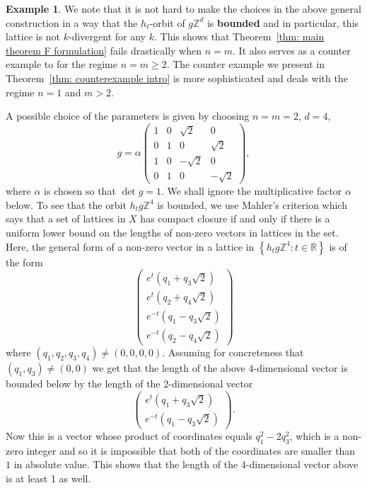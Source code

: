 \documentclass[reqno,11pt, twoside]{amsart}
\theoremstyle{plain}
\theoremstyle{definition}
\newtheorem{exmp}[thm]{Example}
\theoremstyle{definition}
\theoremstyle{remark}
\numberwithin{equation}{section}
\newcommand{\al}{\alpha}
\newcommand{\bR}{\mathbb{R}}
\newcommand{\bZ}{\mathbb{Z}}
\newcommand\seta[1]{\left\{#1\right\}}
\newcommand\pa[1]{\left(#1\right)}
\newcommand\mat[1]{\pa{\begin{matrix}#1\end{matrix}}}
\begin{document}
\begin{exmp}
    We note that it is not hard to make the choices in the above general construction in a way that the $h_t$-orbit of $g\bZ^d$ is \textbf{bounded} and in particular, this lattice is not $k$-divergent for any $k$. This shows that Theorem~\ref{thm: main theorem F formulation} fails drastically when $n=m$. It also serves as a counter example to 
    \cite[Theorem 2.3]{GDV} for the regime $n=m\ge 2$. 
    The counter example we present in Theorem~\ref{thm: counterexample intro} is more sophisticated and deals with the regime $n=1$ and $m>2$. 

    A possible choice of the parameters is given by choosing $n=m=2$, $d=4$,
    $$g = \al \mat{1&0&\sqrt{2}&0\\ 0&1&0&\sqrt{2}\\
    1&0&-\sqrt{2}&0\\ 0&1&0&-\sqrt{2}},$$
    where $\al$ is chosen so that $\det g =1$. We shall ignore the multiplicative factor $\al$ below.  
    To see that the orbit $h_t g\bZ^4$ is bounded, we use Mahler's criterion which says that a set of lattices in $X$ has compact closure if and only if there is a uniform lower bound on the lengths of non-zero vectors in lattices in the set. Here, the general form of a non-zero vector in a lattice in $\seta{h_t g\bZ^4:t\in \bR}$ is of the form 
    $$\mat{ 
    e^t (q_1 + q_3\sqrt{2})\\
    e^t (q_2 +q_4\sqrt{2})\\
    e^{-t}(q_1-q_3\sqrt{2})\\
    e^{-t}(q_2-q_4\sqrt{2})}$$
    where $(q_1,q_2,q_3,q_4)\ne (0,0,0,0)$. Assuming for concreteness that $(q_1,q_3)\ne (0,0)$ we get that the length of the above $4$-dimensional vector is bounded below by the length of the 2-dimensional vector
    $$\mat{e^t (q_1 + q_3\sqrt{2})\\ e^{-t}(q_1-q_3\sqrt{2})}.$$
    Now this is a vector whose product of coordinates equals $q_1^2-2q_3^2$, which is a non-zero integer and so it is impossible that both of the coordinates are smaller than $1$ in absolute value. This shows that the length of the 4-dimensional vector above is at least 1 as well.
    


\end{exmp}
\end{document}
